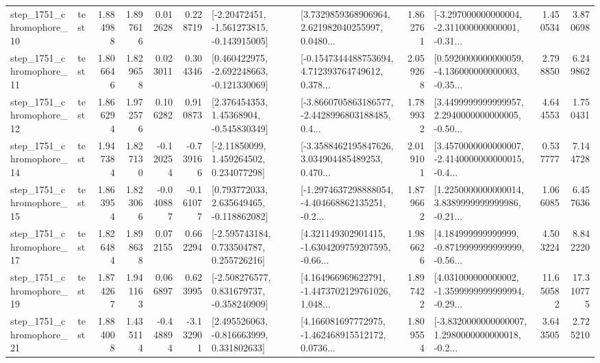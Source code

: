 \begin{tabular}{llrrrrllrlrr}
 step\_1751\_chromophore\_10 &      test &      1.884988 &    1.897616 &      0.012628 &  0.228719 &   [-2.20472451, -1.561273815, -0.143915005] &  [3.7329859368906964, 2.621982040255997, 0.0480... &       1.862761 &  [-3.297000000000004, -2.311000000000001, -0.31... &            1.450534 &          3.870698 \\
 step\_1751\_chromophore\_11 &      test &      1.806646 &    1.829658 &      0.023011 &  0.304346 &   [0.460422975, -2.692248663, -0.121330069] &  [-0.1547344488753694, 4.712393764749612, 0.378... &       2.059268 &  [0.5920000000000059, -4.136000000000003, -0.35... &            2.798850 &          6.249862 \\
 step\_1751\_chromophore\_12 &      test &      1.866294 &    1.972576 &      0.106282 &  0.910873 &     [2.376454353, 1.45368904, -0.545830349] &  [-3.8660705863186577, -2.4428996803188485, 0.4... &       1.789932 &  [3.4499999999999957, 2.2940000000000005, -0.50... &            4.644553 &          1.750431 \\
 step\_1751\_chromophore\_14 &      test &      1.947384 &    1.827130 &     -0.120254 & -0.739166 &     [-2.11850099, 1.459264502, 0.234077298] &  [-3.3588462195847626, 3.034904485489253, 0.470... &       2.019101 &  [3.4570000000000007, -2.4140000000000015, -0.4... &            0.537777 &          7.144728 \\
 step\_1751\_chromophore\_15 &      test &      1.863954 &    1.823066 &     -0.040887 & -0.161077 &    [0.793772033, 2.635649465, -0.118862082] &  [-1.2974637298888054, -4.404668862135251, -0.2... &       1.879662 &  [1.2250000000000014, 3.8389999999999986, -0.21... &            1.066085 &          6.457636 \\
 step\_1751\_chromophore\_17 &      test &      1.826484 &    1.898638 &      0.072155 &  0.662294 &    [-2.595743184, 0.733504787, 0.255726216] &  [4.321149302901415, -1.6304209759207595, -0.66... &       1.986626 &  [4.184999999999999, -0.8719999999999999, -0.56... &            4.503224 &          8.842220 \\
 step\_1751\_chromophore\_19 &      test &      1.874267 &    1.941163 &      0.066897 &  0.623995 &   [-2.508276577, 0.831679737, -0.358240909] &  [4.164966969622791, -1.4473702129761026, 1.048... &       1.897422 &  [4.031000000000002, -1.3599999999999994, -0.29... &           11.650582 &         17.310775 \\
 step\_1751\_chromophore\_21 &      test &      1.884008 &    1.435114 &     -0.448894 & -3.132901 &    [2.495526063, -0.816663999, 0.331802633] &  [4.166081697772975, -1.462468915512172, 0.0736... &       1.809554 &  [-3.8320000000000007, 1.2980000000000018, -0.2... &            3.643505 &          2.725210 \\

\end{tabular}
